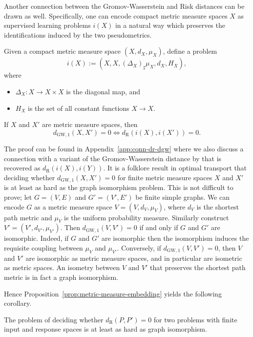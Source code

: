 \documentclass[twoside,11pt]{article}
\newcommand{\dexp}[1][]{d_{\mathrm{R}#1}}
\newcommand{\dGWp}[1]{d_{\mathrm{GW},#1}}
\begin{document}
    Another connection between the Gromov-Wasserstein and Risk distances can be drawn as well. Specifically, one can encode compact metric measure spaces $X$ as supervised learning problems $i(X)$ in a natural way which preserves the identifications induced by the two pseudometrics.
    \begin{proposition}\label{prop:metric-measure-embedding}
        Given a compact metric measure space $(X,d_X,\mu_X)$, define a problem
        \[i(X) := (X, X, (\Delta_X)_\sharp \mu_X, d_X, H_X),\]
        where
        \begin{itemize}
            \item $\Delta_X:X\to X\times X$ is the diagonal map, and
            \item $H_X$ is the set of all constant functions $X\to X$.
        \end{itemize}
        If $X$ and $X'$ are metric measure spaces, then
        \[\dGWp{1}(X,X') = 0 \iff \dexp(i(X),i(X')) = 0.\]
    \end{proposition}
    The proof can be found in Appendix~\ref{app:conn-dr-dgw} where we also discuss a connection with a variant of the Gromov-Wasserstein distance by \citet[Section 4.1]{hang2019topological} that is recovered as $\dexp(i(X),i(Y))$. 
    It is a folklore result in optimal transport that deciding whether $\dGWp{1}(X,X')=0$ for finite metric measure spaces $X$ and $X'$ is at least as hard as the graph isomorphism problem.
    This is not difficult to prove; let $G = (V,E)$ and $G'=(V',E')$ be finite simple graphs. We can encode $G$ as a metric measure space $V = (V,d_V,\mu_V)$, where $d_V$ is the shortest path metric and $\mu_V$ is the uniform probability measure. Similarly construct $V' = (V',d_{V'},\mu_{V'})$. Then $\dGWp{1}(V,V')=0$ if and only if $G$ and $G'$ are isomorphic. Indeed, if $G$ and $G'$ are isomorphic then the isomorphism induces the requisite coupling between $\mu_V$ and $\mu_{V'}$. Conversely, if $\dGWp{1}(V,V')=0$, then
    $V$ and $V'$ are isomorphic as metric measure spaces, and in particular are isometric as metric spaces. An isometry between $V$ and $V'$ that preserves the shortest path metric is in fact a graph isomorphism.
    
    Hence Proposition~\ref{prop:metric-measure-embedding} yields the following corollary.
    \begin{corollary}\label{cor:gi-hard}
        The problem of deciding whether $\dexp(P,P')=0$ for two problems with finite input and response spaces is at least as hard as graph isomorphism.
    \end{corollary}
    
\end{document}
